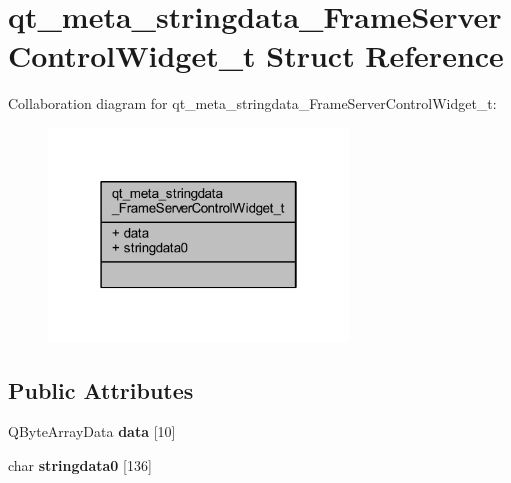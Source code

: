 \hypertarget{structqt__meta__stringdata___frame_server_control_widget__t}{}\section{qt\+\_\+meta\+\_\+stringdata\+\_\+\+Frame\+Server\+Control\+Widget\+\_\+t Struct Reference}
\label{structqt__meta__stringdata___frame_server_control_widget__t}


Collaboration diagram for qt\+\_\+meta\+\_\+stringdata\+\_\+\+Frame\+Server\+Control\+Widget\+\_\+t\+:
\nopagebreak
\begin{figure}[H]
\begin{center}
\leavevmode
\includegraphics[width=226pt]{structqt__meta__stringdata___frame_server_control_widget__t__coll__graph}
\end{center}
\end{figure}
\subsection*{Public Attributes}
\begin{DoxyCompactItemize}
\item 
\hypertarget{structqt__meta__stringdata___frame_server_control_widget__t_a4a1ff2e4d7e0c7b4f16206003fe9d6ff}{}Q\+Byte\+Array\+Data {\bfseries data} \mbox{[}10\mbox{]}\label{structqt__meta__stringdata___frame_server_control_widget__t_a4a1ff2e4d7e0c7b4f16206003fe9d6ff}

\item 
\hypertarget{structqt__meta__stringdata___frame_server_control_widget__t_a5a2e5241aed15650778e40e7256a8944}{}char {\bfseries stringdata0} \mbox{[}136\mbox{]}\label{structqt__meta__stringdata___frame_server_control_widget__t_a5a2e5241aed15650778e40e7256a8944}

\end{DoxyCompactItemize}


